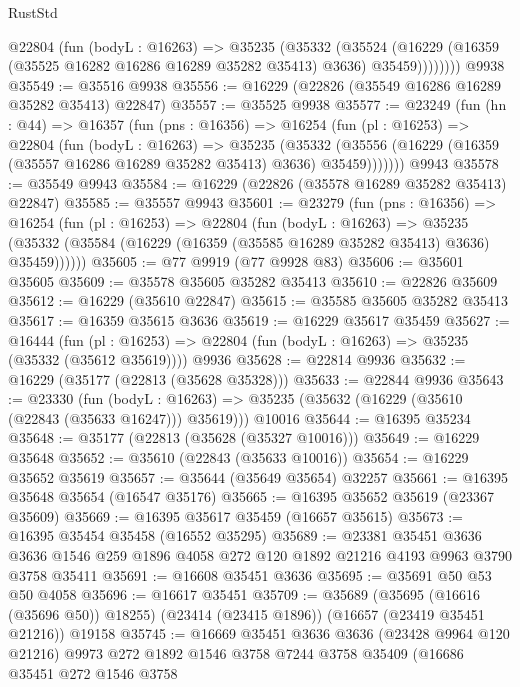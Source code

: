 \begin{lexlean}{RustStd}
\begin{coremodule}
          @22804
            (fun (bodyL : @16263) =>
            @35235
              (@35332
                (@35524
                  (@16229 (@16359 (@35525 @16282 @16286 @16289 @35282 @35413) @3636) @35459))))))))
    @9938
@35549 := @35516 @9938
@35556 := @16229 (@22826 (@35549 @16286 @16289 @35282 @35413) @22847)
@35557 := @35525 @9938
@35577 := @23249
    (fun (hn : @44) =>
    @16357
      (fun (pns : @16356) =>
      @16254
        (fun (pl : @16253) =>
        @22804
          (fun (bodyL : @16263) =>
          @35235
            (@35332
              (@35556 (@16229 (@16359 (@35557 @16286 @16289 @35282 @35413) @3636) @35459)))))))
    @9943
@35578 := @35549 @9943
@35584 := @16229 (@22826 (@35578 @16289 @35282 @35413) @22847)
@35585 := @35557 @9943
@35601 := @23279
    (fun (pns : @16356) =>
    @16254
      (fun (pl : @16253) =>
      @22804
        (fun (bodyL : @16263) =>
        @35235 (@35332 (@35584 (@16229 (@16359 (@35585 @16289 @35282 @35413) @3636) @35459))))))
@35605 := @77 @9919 (@77 @9928 @83)
@35606 := @35601 @35605
@35609 := @35578 @35605 @35282 @35413
@35610 := @22826 @35609
@35612 := @16229 (@35610 @22847)
@35615 := @35585 @35605 @35282 @35413
@35617 := @16359 @35615 @3636
@35619 := @16229 @35617 @35459
@35627 := @16444
    (fun (pl : @16253) => @22804 (fun (bodyL : @16263) => @35235 (@35332 (@35612 @35619))))
    @9936
@35628 := @22814 @9936
@35632 := @16229 (@35177 (@22813 (@35628 @35328)))
@35633 := @22844 @9936
@35643 := @23330
    (fun (bodyL : @16263) => @35235 (@35632 (@16229 (@35610 (@22843 (@35633 @16247))) @35619)))
    @10016
@35644 := @16395 @35234
@35648 := @35177 (@22813 (@35628 (@35327 @10016)))
@35649 := @16229 @35648
@35652 := @35610 (@22843 (@35633 @10016))
@35654 := @16229 @35652 @35619
@35657 := @35644 (@35649 @35654) @32257
@35661 := @16395 @35648 @35654 (@16547 @35176)
@35665 := @16395 @35652 @35619 (@23367 @35609)
@35669 := @16395 @35617 @35459 (@16657 @35615)
@35673 := @16395 @35454 @35458 (@16552 @35295)
@35689 := @23381
    @35451
    @3636
    @3636
    @1546
    @259
    @1896
    @4058
    @272
    @120
    @1892
    @21216
    @4193
    @9963
    @3790
    @3758
    @35411
@35691 := @16608 @35451 @3636
@35695 := @35691 @50 @53 @50 @4058
@35696 := @16617 @35451
@35709 := @35689
    (@35695 (@16616 (@35696 @50)) @18255)
    (@23414 (@23415 @1896))
    (@16657 (@23419 @35451 @21216))
    @19158
@35745 := @16669
    @35451
    @3636
    @3636
    (@23428 @9964 @120 @21216)
    @9973
    @272
    @1892
    @1546
    @3758
    @7244
    @3758
    @35409
    (@16686
      @35451
      @272
      @1546
      @3758

\end{coremodule}
\end{lexlean}
